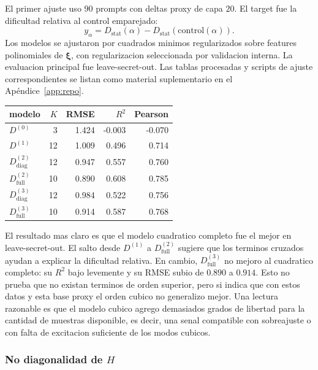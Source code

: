 \documentclass[10pt,twocolumn]{article}
\newcommand{\xrep}{\bm{\xi}}
\begin{document}
El primer ajuste uso \(90\) prompts con deltas proxy de capa \(20\). El target fue la dificultad relativa al control emparejado:
\[
y_\alpha
=
D_{\mathrm{stat}}(\alpha)
-
D_{\mathrm{stat}}(\mathrm{control}(\alpha)).
\]
Los modelos se ajustaron por cuadrados minimos regularizados sobre features polinomiales de \(\xrep\), con regularizacion seleccionada por validacion interna. La evaluacion principal fue leave-secret-out. Las tablas procesadas y scripts de ajuste correspondientes se listan como material suplementario en el Apéndice~\ref{app:repo}.

\begin{center}
\scriptsize
\begin{tabular}{@{}lrrrr@{}}
\toprule
modelo & \(K\) & RMSE & \(R^2\) & Pearson \\
\midrule
\(D^{(0)}\) & 3 & 1.424 & -0.003 & -0.070 \\
\(D^{(1)}\) & 12 & 1.009 & 0.496 & 0.714 \\
\(D^{(2)}_{\mathrm{diag}}\) & 12 & 0.947 & 0.557 & 0.760 \\
\(D^{(2)}_{\mathrm{full}}\) & 10 & 0.890 & 0.608 & 0.785 \\
\(D^{(3)}_{\mathrm{diag}}\) & 12 & 0.984 & 0.522 & 0.756 \\
\(D^{(3)}_{\mathrm{full}}\) & 10 & 0.914 & 0.587 & 0.768 \\
\bottomrule
\end{tabular}
\end{center}

El resultado mas claro es que el modelo cuadratico completo fue el mejor en leave-secret-out. El salto desde \(D^{(1)}\) a \(D^{(2)}_{\mathrm{full}}\) sugiere que los terminos cruzados ayudan a explicar la dificultad relativa. En cambio, \(D^{(3)}_{\mathrm{full}}\) no mejoro al cuadratico completo: su \(R^2\) bajo levemente y su RMSE subio de \(0.890\) a \(0.914\). Esto no prueba que no existan terminos de orden superior, pero si indica que con estos datos y esta base proxy el orden cubico no generalizo mejor. Una lectura razonable es que el modelo cubico agrego demasiados grados de libertad para la cantidad de muestras disponible, es decir, una senal compatible con sobreajuste o con falta de excitacion suficiente de los modos cubicos.

\subsubsection*{No diagonalidad de \texorpdfstring{\(H\)}{H}}
\end{document}

